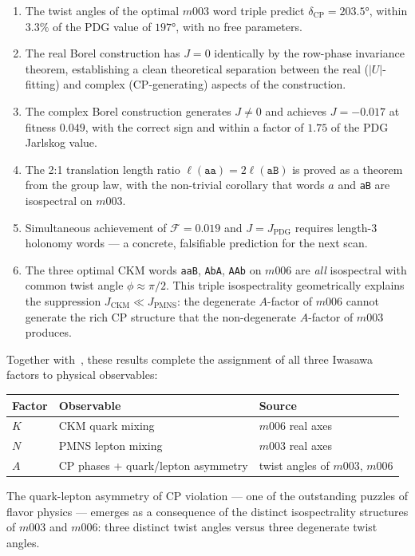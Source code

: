 \documentclass[floatfix,aps,prd,twocolumn,showpacs,superscriptaddress,longbibliography]{revtex4-2}
\begin{document}
\begin{enumerate}
\item The twist angles of the optimal $m003$ word triple predict
$\delta_{\mathrm{CP}} = 203.5°$, within $3.3\%$ of the PDG value
of $197°$, with no free parameters.

\item The real Borel construction has $J = 0$ identically by the
row-phase invariance theorem, establishing a clean theoretical
separation between the real ($|U|$-fitting) and complex
(CP-generating) aspects of the construction.

\item The complex Borel construction generates $J \neq 0$ and
achieves $J = -0.017$ at fitness $0.049$, with the correct sign
and within a factor of $1.75$ of the PDG Jarlskog value.

\item The 2:1 translation length ratio $\ell(\texttt{aa}) = 2\ell(\texttt{aB})$
is proved as a theorem from the group law, with the non-trivial
corollary that words $a$ and \texttt{aB} are isospectral on $m003$.

\item Simultaneous achievement of $\mathcal{F} = 0.019$ and
$J = J_{\mathrm{PDG}}$ requires length-3 holonomy words — a
concrete, falsifiable prediction for the next scan.

\item The three optimal CKM words \texttt{aaB}, \texttt{AbA},
\texttt{AAb} on $m006$ are \emph{all} isospectral with common
twist angle $\phi \approx \pi/2$. This triple isospectrality
geometrically explains the suppression
$J_{\mathrm{CKM}} \ll J_{\mathrm{PMNS}}$: the degenerate
$A$-factor of $m006$ cannot generate the rich CP structure
that the non-degenerate $A$-factor of $m003$ produces.
\end{enumerate}

Together with~\cite{Gentry:CKM,Gentry:PMNS}, these results
complete the assignment of all three Iwasawa factors to
physical observables:
\begin{center}
\begin{tabular}{lll}
\toprule
Factor & Observable & Source \\
\midrule
$K$ & CKM quark mixing & $m006$ real axes \\
$N$ & PMNS lepton mixing & $m003$ real axes \\
$A$ & CP phases + quark/lepton asymmetry & twist angles of $m003$, $m006$ \\
\bottomrule
\end{tabular}
\end{center}
The quark-lepton asymmetry of CP violation --- one of the
outstanding puzzles of flavor physics --- emerges as a
consequence of the distinct isospectrality structures of
$m003$ and $m006$: three distinct twist angles versus
three degenerate twist angles.
\end{document}
